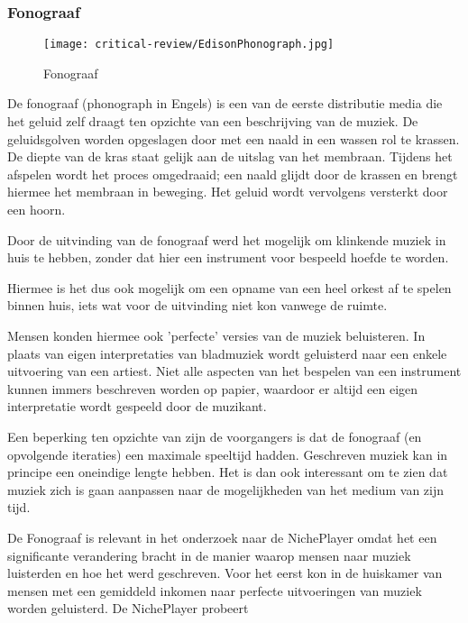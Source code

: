 \subsubsection*{Fonograaf}
\begin{wrapfigure}{r}{0.25\textwidth}
    \centering
    \texttt{[image: critical-review/EdisonPhonograph.jpg]}
    \caption{Fonograaf}
    \label{fig:critical-review:phonograph}
\end{wrapfigure}

De fonograaf (phonograph in Engels) is een van de eerste distributie media die het geluid zelf draagt ten opzichte van een beschrijving van de muziek. De geluidsgolven worden opgeslagen door met een naald in een wassen rol te krassen. De diepte van de kras staat gelijk aan de uitslag van het membraan. Tijdens het afspelen wordt het proces omgedraaid; een naald glijdt door de krassen en brengt hiermee het membraan in beweging. Het geluid wordt vervolgens versterkt door een hoorn.

Door de uitvinding van de fonograaf werd het mogelijk om klinkende muziek in huis te hebben, zonder dat hier een instrument voor bespeeld hoefde te worden. 

Hiermee is het dus ook mogelijk om een opname van een heel orkest af te spelen binnen huis, iets wat voor de uitvinding niet kon vanwege de ruimte.  

Mensen konden hiermee ook 'perfecte' versies van de muziek beluisteren. In plaats van eigen interpretaties van bladmuziek wordt geluisterd naar een enkele uitvoering van een artiest. Niet alle aspecten van het bespelen van een instrument kunnen immers beschreven worden op papier, waardoor er altijd een eigen interpretatie wordt gespeeld door de muzikant.

Een beperking ten opzichte van zijn de voorgangers is dat de fonograaf (en opvolgende iteraties) een maximale speeltijd hadden. Geschreven muziek kan in principe een oneindige lengte hebben. Het is dan ook interessant om te zien dat muziek zich is gaan aanpassen naar de mogelijkheden van het medium van zijn tijd.

De Fonograaf is relevant in het onderzoek naar de NichePlayer omdat het een significante verandering bracht in de manier waarop mensen naar muziek luisterden en hoe het werd geschreven. Voor het eerst kon in de huiskamer van mensen met een gemiddeld inkomen naar perfecte uitvoeringen van muziek worden geluisterd. De NichePlayer probeert

